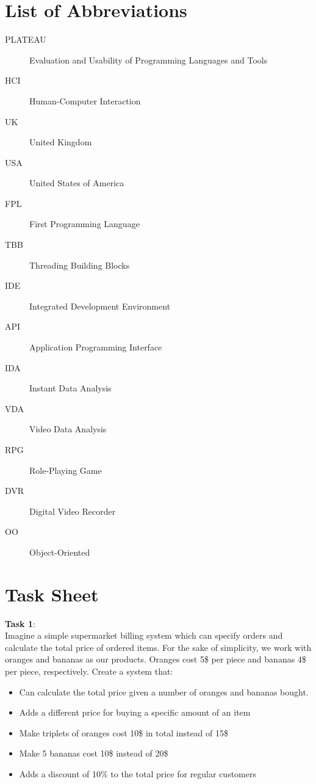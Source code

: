 \chapter{List of Abbreviations}
\begin{description}
\item[PLATEAU] Evaluation and Usability of Programming Languages and Tools
\item[HCI] Human-Computer Interaction
\item[UK] United Kingdom
\item[USA] United States of America
\item[FPL] First Programming Language
\item[TBB] Threading Building Blocks
\item[IDE] Integrated Development Environment
\item[API] Application Programming Interface
\item[IDA] Instant Data Analysis
\item[VDA] Video Data Analysis
\item[RPG] Role-Playing Game
\item[DVR] Digital Video Recorder
\item[OO] Object-Oriented
\end{description}

\chapter{Task Sheet}
\label{chapter:taskSheet}
\textbf{Task 1}:\\
Imagine a simple supermarket billing system which can specify orders and calculate the total price of ordered items. For the sake of simplicity, we work with oranges and bananas as our products. Oranges cost 5\$ per piece and bananas 4\$ per piece, respectively. Create a system that:
\begin{itemize}
\item Can calculate the total price given a number of oranges and bananas bought.
\item Adds a different price for buying a specific amount of an item 
\item Make triplets of oranges cost 10\$ in total instead of 15\$
\item Make 5 bananas cost 10\$ instead of 20\$
\item Adds a discount of 10\% to the total price for regular customers
\end{itemize}

